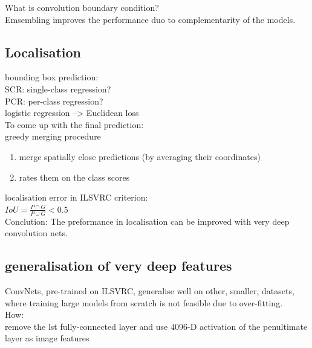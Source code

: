 \documentclass[11pt]{article}
\begin{document}
What is convolution boundary condition? \\

Emsembling improves the performance duo to complementarity of the models. \\

\subsection{Localisation}
\label{sec-2-6}

bounding box prediction: \\
SCR: single-class regression? \\
PCR: per-class regression? \\

logistic regression --> Euclidean loss \\

To come up with the final prediction: \\
greedy merging procedure \\
\begin{enumerate}
\item merge spatially close predictions (by averaging their coordinates) \\
\item rates them on the class scores \\
\end{enumerate}

localisation error in ILSVRC criterion: \\
$IoU = \frac{P\cap G}{P\cup G} < 0.5$  \\

Conclution: The preformance in localisation can be improved with very deep convolution nets. \\

\subsection{generalisation of very deep features}
\label{sec-2-7}
ConvNets, pre-trained on ILSVRC, generalise well on other, smaller, datasets, \\
where training large models from scratch is not feasible due to over-fitting. \\

How: \\
remove the lst fully-connected layer and use 4096-D activation of the penultimate layer as image features \\
\end{document}
